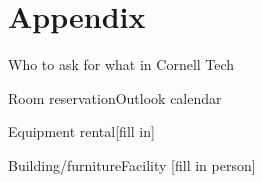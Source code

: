 \section{Appendix}
\begin{checklist}{Who to ask for what in Cornell Tech}
  \item{Room reservation}{Outlook calendar} 
  \item{Equipment rental}{[fill in]}
  \item{Building/furniture}{Facility [fill in person]}
\end{checklist}
